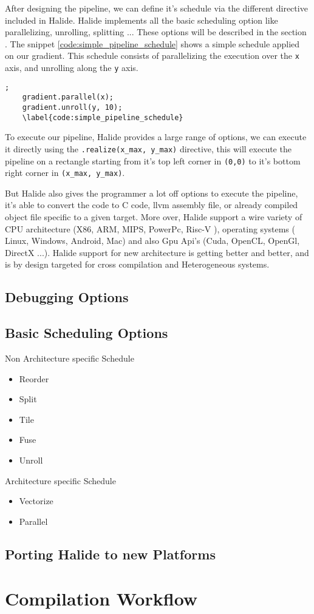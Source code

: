 	After designing the  pipeline, we can define it's schedule via the different directive included in Halide. Halide implements all the basic scheduling option like parallelizing, unrolling, splitting ... These options will be described in the section 
	. The snippet 
	\ref{code:simple_pipeline_schedule} 
	shows a simple schedule applied on our gradient. This schedule consists of parallelizing the execution over the \texttt{x} axis, and unrolling along the  \texttt{y} axis.

	\begin{lstlisting}[caption={Simple Pipeline Example}, captionpos=b,label={code:simple_pipeline_schedule}];
	gradient.parallel(x);
	gradient.unroll(y, 10);
	\label{code:simple_pipeline_schedule}
	\end{lstlisting}


	To execute our pipeline, Halide provides a large range of options, we can execute it directly using the \verb|.realize(x_max, y_max)| directive, this will execute the pipeline on a rectangle starting from it's top left corner in  \verb|(0,0)| to it's bottom right corner in \verb|(x_max, y_max)|.
	
	But Halide also gives the programmer a lot off options to execute the pipeline, it's able to convert the code to C code, llvm assembly file, or already compiled object file specific to a given target. More over, Halide support a wire variety of CPU architecture (X86, ARM, MIPS, PowerPc, Risc-V  ), operating systems ( Linux, Windows, Android, Mac) and also Gpu Api's (Cuda, OpenCL, OpenGl, DirectX ...). Halide support for new architecture is getting better and better, and is by design targeted for cross compilation and Heterogeneous systems.

	\subsection{Debugging Options}

	\subsection { Basic Scheduling Options}
	\label{section:scheduling}
	Non Architecture specific Schedule
	\begin{itemize}
		\item Reorder
		\item Split
		\item Tile
		\item Fuse
		\item Unroll
	\end{itemize}
	Architecture specific Schedule
	\begin{itemize}
		\item Vectorize
		\item Parallel

	\end{itemize}

	\subsection { Porting Halide to new Platforms}

\section{Compilation Workflow}

